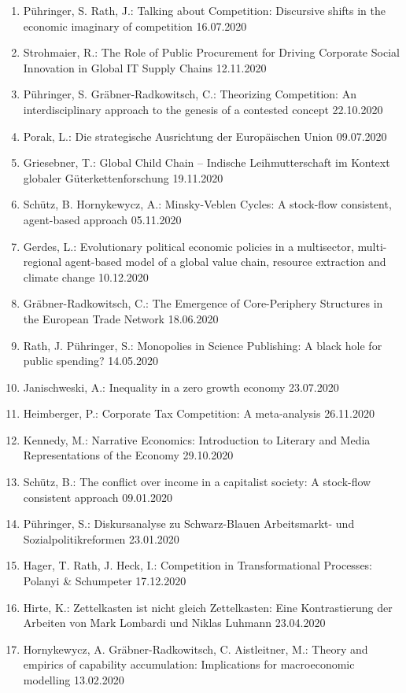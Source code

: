 \begin{enumerate}
	\item Pühringer, S. Rath, J.: Talking about Competition: Discursive shifts in the economic imaginary of competition 16.07.2020
	\item Strohmaier, R.: The Role of Public Procurement for Driving Corporate Social Innovation in Global IT Supply Chains 12.11.2020
	\item Pühringer, S. Gräbner-Radkowitsch, C.: Theorizing Competition: An interdisciplinary approach to the genesis of a contested concept 22.10.2020
	\item Porak, L.: Die strategische Ausrichtung der Europäischen Union 09.07.2020
	\item Griesebner, T.: Global Child Chain -- Indische Leihmutterschaft im Kontext globaler Güterkettenforschung 19.11.2020
	\item Schütz, B. Hornykewycz, A.: Minsky-Veblen Cycles: A stock-flow consistent, agent-based approach 05.11.2020
	\item  Gerdes, L.: Evolutionary political economic policies in a multisector, multi-regional agent-based model of a global value chain, resource extraction and climate change 10.12.2020
	\item Gräbner-Radkowitsch, C.: The Emergence of Core-Periphery Structures in the European Trade Network 18.06.2020
	\item Rath, J. Pühringer, S.: Monopolies in Science Publishing: A black hole for public spending? 14.05.2020
	\item  Janischweski, A.: Inequality in a zero growth economy 23.07.2020
	\item Heimberger, P.: Corporate Tax Competition: A meta-analysis 26.11.2020
	\item  Kennedy, M.: Narrative Economics: Introduction to Literary and Media Representations of the Economy 29.10.2020
	\item Schütz, B.: The conflict over income in a capitalist society: A stock-flow consistent approach 09.01.2020
	\item Pühringer, S.: Diskursanalyse zu Schwarz-Blauen Arbeitsmarkt- und Sozialpolitikreformen 23.01.2020
	\item Hager, T. Rath, J. Heck, I.: Competition in Transformational Processes: Polanyi \& Schumpeter 17.12.2020
	\item Hirte, K.: Zettelkasten ist nicht gleich Zettelkasten: Eine Kontrastierung der Arbeiten von Mark Lombardi und Niklas Luhmann 23.04.2020
	\item Hornykewycz, A. Gräbner-Radkowitsch, C. Aistleitner, M.: Theory and empirics of capability accumulation: Implications for macroeconomic modelling 13.02.2020
\end{enumerate}
